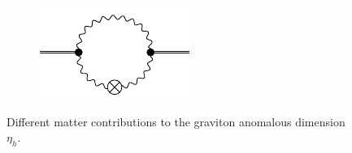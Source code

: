 \begin{figure}[t]
\begin{subfigure}{0.3\textwidth}
 	\includegraphics[width=\textwidth]{figs/TikZ/gauge_field_contribution}
 \end{subfigure} 
 \hfill
 \caption{Different matter contributions to the graviton anomalous dimension $\eta_h$.}	
 \end{figure}
 
 \blindtext
 
